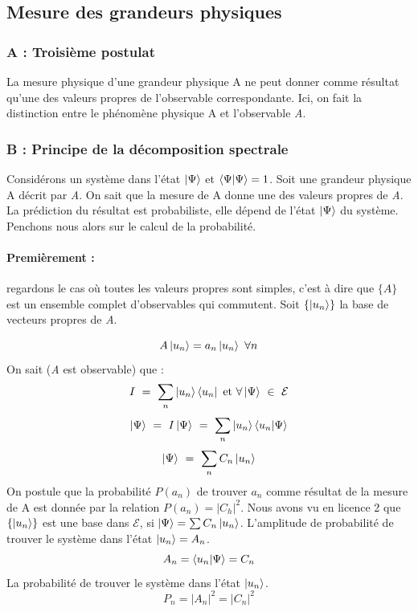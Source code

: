 \documentclass[12pt,a4paper,titlepage]{book}
\begin{document}
\subsection{Mesure des grandeurs physiques}
\subsubsection{A : Troisième postulat}
La mesure physique d'une grandeur physique A ne peut donner comme résultat qu'une des valeurs propres de l'observable correspondante. Ici, on fait la distinction entre le phénomène physique A et l'observable \textit{A}.

\subsubsection{B : Principe de la décomposition spectrale}
Considérons un système dans l'état $\ket \Psi$ et $\braket{\Psi | \Psi} = 1$. Soit une grandeur physique A décrit par \textit{A}. On sait que la mesure de A donne une des valeurs propres de \textit{A}. La prédiction du résultat est probabiliste, elle dépend de l'état $\ket \Psi$ du système. Penchons nous alors sur le calcul de la probabilité.\\

\paragraph*{Premièrement :}
regardons le cas où toutes les valeurs propres sont simples, c'est à dire que $\lbrace A \rbrace$ est un ensemble complet d'observables qui commutent. Soit $\lbrace \ket{u_n} \rbrace$ la base de vecteurs propres de \textit{A}.

\begin{equation*}
A \ket{u_n} = a_n \ket{u_n} ~\forall n
\end{equation*}
On sait (\textit{A} est observable) que :
\begin{equation*}
I ~=~ \sum\limits_n \ket{u_n} \bra{u_n} ~\text{et}~ \forall \ket\Psi ~\in~ \mathcal{E}
\end{equation*}
\begin{equation*}
\ket \Psi ~=~ I \ket\Psi ~=~ \sum\limits_n \ket{u_n} \braket{u_n | \Psi}
\end{equation*}
\begin{equation*}
\ket \Psi ~=~ \sum\limits_n C_n \ket{u_n}
\end{equation*}
On postule que la probabilité $P(a_n)$ de trouver $a_n$ comme résultat de la mesure de A est donnée par la relation $P(a_n) = \vert C_h \vert^2$. Nous avons vu en licence 2 que $\lbrace \ket{u_n} \rbrace$ est une base dans $\mathcal{E}$, si $\ket\Psi = \sum C_n \ket{u_n}$. L'amplitude de probabilité de trouver le système dans l'état $\ket{u_n} = A_n$.
\begin{equation*}
A_n = \braket{u_n | \Psi} = C_n
\end{equation*}
La probabilité de trouver le système dans l'état $\ket{u_n}$.
\begin{equation*}
P_n = \vert A_n \vert^2 = \vert C_n \vert^2
\end{equation*}\\
\end{document}
